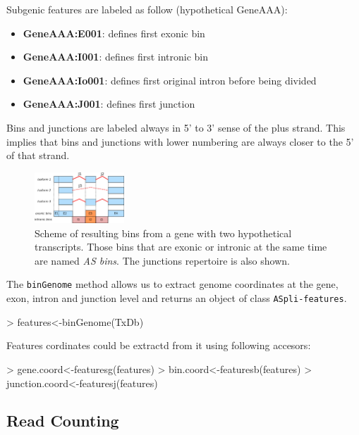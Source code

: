 \documentclass{article}
\begin{document}
Subgenic features are labeled as follow (hypothetical GeneAAA):
\begin{itemize}
\item \textbf{GeneAAA:E001}: defines first exonic bin
\item \textbf{GeneAAA:I001}: defines first intronic bin
\item \textbf{GeneAAA:Io001}: defines first original intron before being divided
\item \textbf{GeneAAA:J001}: defines first junction
\end{itemize}

Bins and junctions are labeled always in  5' to 3' sense of the plus strand. This implies that  bins and junctions with lower numbering are always closer to the 5' of that strand.

  
\begin{figure}[ht!]
\centering
\includegraphics[width=0.3\textwidth]{binDefinition.png}
\caption{Scheme of resulting bins from a gene with two hypothetical transcripts. Those bins that are exonic or intronic at the same time are named \textit{AS bins}. The junctions repertoire is also shown.
}
\end{figure}


The \texttt{binGenome} method allows us to  extract genome coordinates at the gene, exon, intron and junction level and returns an object of class \texttt{ASpli-features}.

\begin{Schunk}
\begin{Sinput}
> features<-binGenome(TxDb) 
\end{Sinput}
\end{Schunk}
Features cordinates could be extractd from it using following accesors:
 
\begin{Schunk}
\begin{Sinput}
> gene.coord<-featuresg(features)
> bin.coord<-featuresb(features)
> junction.coord<-featuresj(features)
\end{Sinput}
\end{Schunk}
 
\subsection{Read Counting} 
\end{document}
